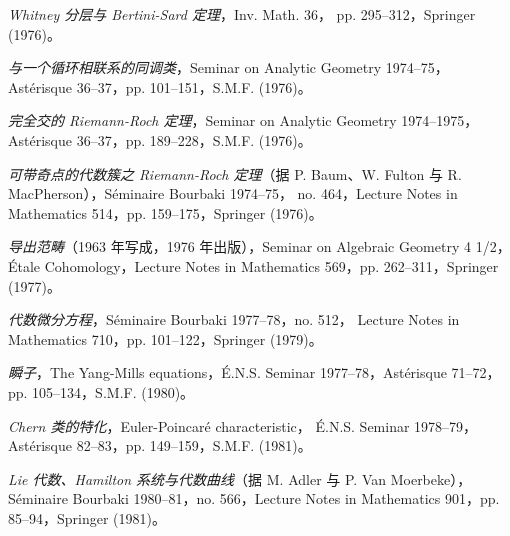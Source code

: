 \clearpage
{}
\small
\begin{description}
\item[{[24]}] \emph{Whitney 分层与 Bertini-Sard 定理}，Inv. Math. 36，
pp. 295--312，Springer (1976)。

\item[{[25]}] \emph{与一个循环相联系的同调类}，Seminar on Analytic
Geometry 1974--75，Astérisque 36--37，pp. 101--151，S.M.F. (1976)。

\item[{[26]}] \emph{完全交的 Riemann-Roch 定理}，Seminar on Analytic
Geometry 1974--1975，Astérisque 36--37，pp. 189--228，S.M.F. (1976)。

\item[{[27]}] \emph{可带奇点的代数簇之 Riemann-Roch 定理}（据
P. Baum、W. Fulton 与 R. MacPherson），Séminaire Bourbaki 1974--75，
no. 464，Lecture Notes in Mathematics 514，pp. 159--175，Springer
(1976)。

\item[{[28]}] \emph{导出范畴}（1963 年写成，1976 年出版），Seminar on
Algebraic Geometry 4 1/2，Étale Cohomology，Lecture Notes in Mathematics
569，pp. 262--311，Springer (1977)。

\item[{[29]}] \emph{代数微分方程}，Séminaire Bourbaki 1977--78，no. 512，
Lecture Notes in Mathematics 710，pp. 101--122，Springer (1979)。

\item[{[30]}] \emph{瞬子}，The Yang-Mills equations，É.N.S. Seminar
1977--78，Astérisque 71--72，pp. 105--134，S.M.F. (1980)。

\item[{[31]}] \emph{Chern 类的特化}，Euler-Poincaré characteristic，
É.N.S. Seminar 1978--79，Astérisque 82--83，pp. 149--159，S.M.F. (1981)。

\item[{[32]}] \emph{Lie 代数、Hamilton 系统与代数曲线}（据 M. Adler
与 P. Van Moerbeke），Séminaire Bourbaki 1980--81，no. 566，Lecture
Notes in Mathematics 901，pp. 85--94，Springer (1981)。


\end{description}
